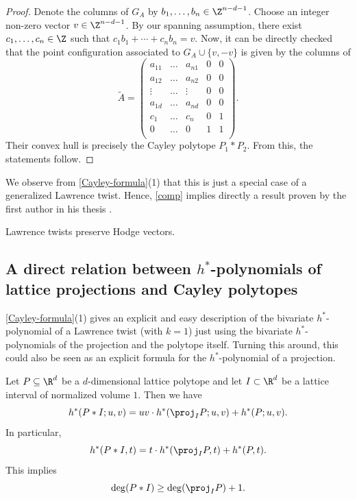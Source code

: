 \documentclass[reqno, 11pt, a4paper, oneside]{amsart}
\begin{document}
\begin{proof}
Denote the columns of $G_A$ by $b_1, \ldots, b_n \in \Z^{n-d-1}$. Choose an integer non-zero vector $v \in \Z^{n - d - 1}$. By our spanning assumption, 
there exist $c_1,\ldots,c_n \in \Z$ such that $c_1 b_1 + \cdots + c_n b_n = v$. 
Now, it can be directly checked that the point configuration associated to $G_A\cup \{v, -v\}$ is given by the columns of  
    \[ \tilde{A}  = \begin{pmatrix}
         a_{11} & \ldots& a_{n1} & 0 & 0 \\
         a_{12}& \ldots &a_{n2} & 0 & 0 \\
         \vdots &\ldots &\vdots & 0 & 0  \\ 
         a_{1d} &\ldots& a_{nd} & 0 & 0 \\
         c_1 & \ldots & c_n & 0 & 1 \\ 
         0 & \ldots & 0 & 1 & 1 \\ 
     \end{pmatrix}. \] 
Their convex hull is precisely the Cayley polytope $P_1 * P_2$. From this, the statements follow.
\end{proof}


We observe from \cref{Cayley-formula}(1) that this is just a special case of a generalized Lawrence twist. Hence, \cref{comp} implies directly a result proven by the first author in his thesis \cite{vadym_thesis}.


\begin{cor} \label{lawrence_twist}
Lawrence twists preserve Hodge vectors.
\end{cor}

\subsection{A direct relation between \texorpdfstring{$h^*$}{h*}-polynomials of lattice projections and Cayley polytopes}

\cref{Cayley-formula}(1) gives an explicit and easy description of the bivariate $h^*$-polynomial of a Lawrence twist (with $k=1$) just using the bivariate $h^*$-polynomials of the projection and the polytope itself. Turning this around, this could also be seen as an explicit formula for the $h^*$-polynomial of a projection. 


\begin{cor} Let $P \subseteq \R^d$ be a $d$-dimensional lattice polytope and let $I \subset \R^d$ be a lattice interval of normalized volume $1$. Then we have
\[ h^*( P * I; u, v)= u v \cdot h^*( \proj_I P; u,v) + h^*(P;u,v). \] 
In particular, 
\[ h^*( P * I, t) = t \cdot h^*( \proj_I P, t) + h^*(P,t).\] 
This implies
\[\deg(P * I) \ge \deg(\proj_I P) + 1.\]
\end{cor}
\end{document}
